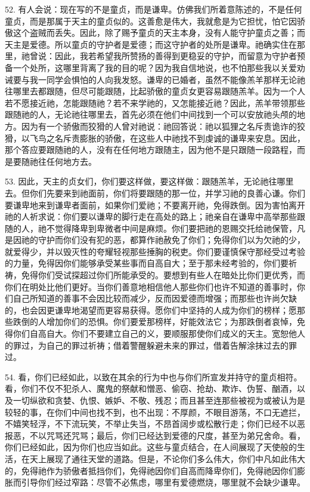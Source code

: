 52. 有人会说：现在写的不是童贞，而是谦卑。仿佛我们所着意陈述的，不是任何童贞，而是那属于天主的童贞似的。这善愈是伟大，我就愈是为它担忧，怕它因骄傲这个盗贼而丢失。因此，除了赐予童贞的天主本身，没有人能守护童贞之善；而天主是爱德。所以童贞的守护者是爱德；而这守护者的处所是谦卑。祂确实住在那里，祂曾说：因此，我若希望我所赞扬的善得到更稳妥的守护，而留意为守护者预备一个处所，这哪里背离了我的目的呢？因为我自信地说，也不怕那些我以关爱劝诫要与我一同学会惧怕的人向我发怒。谦卑的已婚者，虽然不能像羔羊那样无论祂往哪里去都跟随，但尽可能跟随，比起骄傲的童贞女更容易跟随羔羊。因为一个人若不愿接近祂，怎能跟随祂？若不来学祂的，又怎能接近祂？因此，羔羊带领那些跟随祂的人，无论祂往哪里去，首先必须在他们中间找到一个可以安放祂头颅的地方。因为有一个骄傲而狡猾的人曾对祂说：祂回答说：祂以狐狸之名斥责诡诈的狡猾，以飞鸟之名斥责膨胀的骄傲，在这些人中祂找不到虔诚的谦卑来安息。因此，那个答应要跟随祂的人，没有在任何地方跟随主，因为他不是只跟随一段路程，而是要随祂往任何地方去。\par

53. 因此，天主的贞女们，你们要这样做，要这样做：跟随羔羊，无论祂往哪里去。但你们先要来到祂面前，你们将要跟随的那一位，并学习祂的良善心谦。你们要谦卑地来到谦卑者面前，如果你们爱祂；不要离开祂，免得跌倒。因为害怕离开祂的人祈求说：你们要以谦卑的脚行走在高处的路上；祂亲自在谦卑中高举那些跟随的人，祂不觉得降卑到卑微者中间是麻烦。你们要把祂的恩赐交托给祂保管，凡是因祂的守护而你们没有犯的恶，都算作祂赦免了你们；免得你们以为欠祂的少，就爱得少，并以毁灭性的夸耀轻视那些捶胸的税吏。你们要谨慎保守那经受过考验的力量，免得因你们能够承受某些事而自高自大；至于那未经考验的，你们要祈祷，免得你们受试探超过你们所能承受的。要想到有些人在暗处比你们更优秀，而你们在明处比他们更好。当你们善意地相信他人那些你们也许不知道的善事时，你们自己所知道的善事不会因比较而减少，反而因爱德而增强；而那些也许尚欠缺的，也会因更谦卑地渴望而更容易获得。愿你们中坚持的人成为你们的榜样；愿那些跌倒的人增加你们的恐惧。你们要爱那榜样，好能效法它；为那跌倒者哀悼，免得你们自高自大。你们不要建立自己的义，要顺服那使你们成义的天主。宽恕他人的罪过，为自己的罪过祈祷；借着警醒躲避未来的罪过，借着告解涂抹过去的罪过。\par

54. 看，你们已经如此，以致在其余的行为中也与你们所宣发并持守的童贞相符。看，你们不仅不犯杀人、魔鬼的祭献和憎恶、偷窃、抢劫、欺诈、伪誓、酗酒，以及一切纵欲和贪婪、仇恨、嫉妒、不敬、残忍；而且甚至连那些被视为或被认为是较轻的事，在你们中间也找不到，也不出现：不厚颜，不眼目游荡，不口无遮拦，不嬉笑轻浮，不下流玩笑，不举止失当，不昂首阔步或松散行走；你们已经不以恶报恶，不以咒骂还咒骂；最后，你们已经达到爱德的尺度，甚至为弟兄舍命。看，你们已经如此，因为你们也应当如此。这些与童贞结合，在人间展现了天使般的生活，在天上展现了通往天堂的道路。但是，不论你们多么伟大，你们中凡如此伟大的，免得祂作为骄傲者抵挡你们，免得祂因你们自高而降卑你们，免得祂因你们膨胀而引导你们经过窄路：尽管不必焦虑，哪里有爱德燃烧，哪里就不会缺少谦卑。\par

